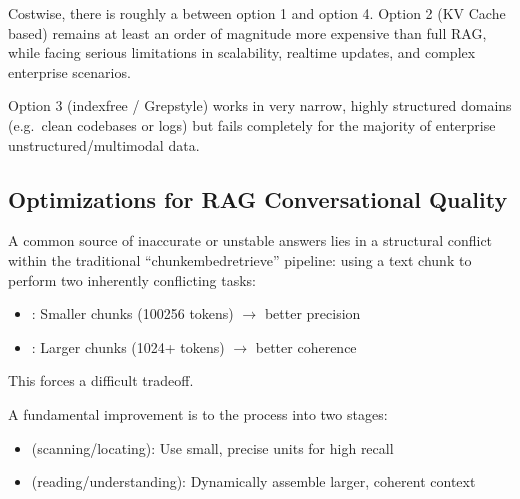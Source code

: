 \documentclass[letterpaper,10pt,english]{sphinxmanual}
\begin{document}
\sphinxAtStartPar
Cost\sphinxhyphen{}wise, there is roughly a  between
option 1 and option 4. Option 2 (KV Cache based) remains at least an
order of magnitude more expensive than full RAG, while facing serious
limitations in scalability, real\sphinxhyphen{}time updates, and complex enterprise
scenarios.

\sphinxAtStartPar
Option 3 (index\sphinxhyphen{}free / Grep\sphinxhyphen{}style) works in very narrow, highly
structured domains (e.g. clean codebases or logs) but fails completely
for the majority of enterprise unstructured/multi\sphinxhyphen{}modal data.


\subsection{Optimizations for RAG Conversational Quality}
\label{\detokenize{blog-dec-2025:optimizations-for-rag-conversational-quality}}
\sphinxAtStartPar
A common source of inaccurate or unstable answers lies in a structural
conflict within the traditional “chunk\sphinxhyphen{}embed\sphinxhyphen{}retrieve” pipeline: using a
 text chunk to perform two inherently
conflicting tasks:
\begin{itemize}
\item {} 
\sphinxAtStartPar
{}: Smaller chunks (100\textendash{}256 tokens) \(\rightarrow\)
better precision

\item {} 
\sphinxAtStartPar
{}: Larger chunks (1024+ tokens)
\(\rightarrow\) better coherence

\end{itemize}

\sphinxAtStartPar
This forces a difficult trade\sphinxhyphen{}off.

\sphinxAtStartPar
A fundamental improvement is to  the process into two
stages:
\begin{itemize}
\item {} 
\sphinxAtStartPar
{} (scanning/locating): Use small, precise units for high
recall

\item {} 
\sphinxAtStartPar
{} (reading/understanding): Dynamically assemble larger,
coherent context

\end{itemize}
\end{document}

